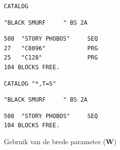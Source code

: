 \begin{description}[leftmargin=2cm,style=nextline]
\begin{tcolorbox}[colback=black,coltext=white]
\verbatimfont{\codefont}
\begin{verbatim}
CATALOG
\end{verbatim}

\selectfont{\codefont 0}
\begin{tcolorbox}[colback=white,coltext=black,arc=0mm,boxrule=0mm,
       left*=0.5mm,right*=0mm,top=0mm,bottom=0mm,nobeforeafter,       left skip=0.5mm,       width=28mm,height=3mm,valign=center]
\begin{verbatim}
"BLACK SMURF     " BS 2A
\end{verbatim}
\end{tcolorbox}
\begin{verbatim}
508  "STORY PHOBOS"     SEQ
27   "C8096"            PRG
25   "C128"             PRG
104 BLOCKS FREE.
\end{verbatim}
\end{tcolorbox}

\begin{tcolorbox}[colback=black,coltext=white]
\verbatimfont{\codefont}
\begin{verbatim}
CATALOG "*,T=S"
\end{verbatim}

\selectfont{\codefont 0}
\begin{tcolorbox}[colback=white,coltext=black,arc=0mm,boxrule=0mm,
       left*=0.5mm,right*=0mm,top=0mm,bottom=0mm,nobeforeafter,       left skip=0.5mm,       width=28mm,height=3mm,valign=center]
\begin{verbatim}
"BLACK SMURF     " BS 2A
\end{verbatim}
\end{tcolorbox}
\begin{verbatim}
508  "STORY PHOBOS"     SEQ
104 BLOCKS FREE.
\end{verbatim}
\end{tcolorbox}

                  Gebruik van de brede parameter ({\bf W})

\label{3columndirlisting}


\end{description}
